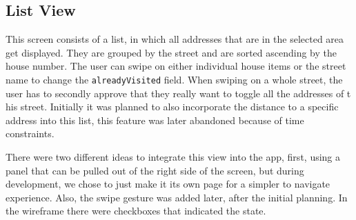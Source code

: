 \subsection{List View}

This screen consists of a list, in which all addresses that are in the selected area get displayed. They are grouped by the street and are sorted ascending by the house number. The user can swipe on either individual house items or the street name to change the \texttt{alreadyVisited} field. When swiping on a whole street, the user has to secondly approve that they really want to toggle all the addresses of t    \label{Table:ColorCombinations}
his street. Initially it was planned to also incorporate the distance to a specific address into this list, this feature was later abandoned because of time constraints. 

\blankLine

There were two different ideas to integrate this view into the app, first, using a panel that can be pulled out of the right side of the screen, but during development, we chose to just make it its own page for a simpler to navigate experience. Also, the swipe gesture was added later, after the initial planning. In the wireframe there were checkboxes that indicated the state.

